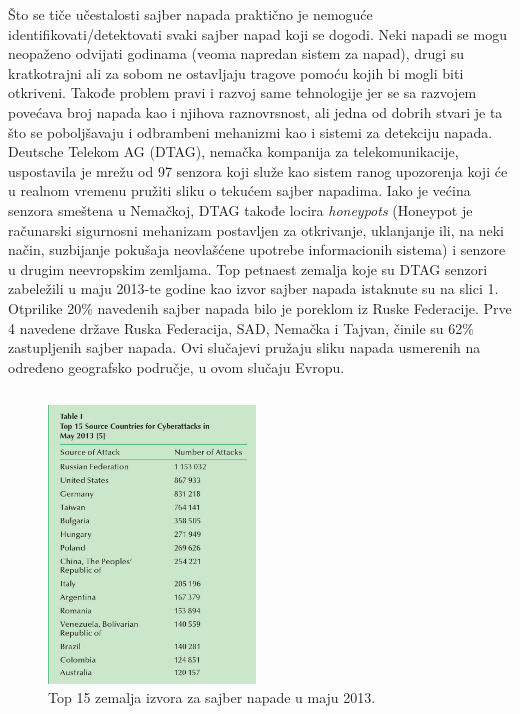 \documentclass[a4paper]{article}
\begin{document}
{Što se tiče učestalosti sajber napada praktično je nemoguće identifikovati/detektovati svaki sajber napad koji se dogodi.
Neki napadi se mogu neopaženo odvijati godinama (veoma napredan sistem za napad), drugi su kratkotrajni ali za sobom ne ostavljaju tragove pomoću kojih bi mogli biti otkriveni.
Takođe problem pravi i razvoj same tehnologije jer se sa razvojem povećava broj napada kao i njihova raznovrsnost, ali jedna od dobrih stvari je ta što se poboljšavaju i odbrambeni mehanizmi kao i sistemi za detekciju napada.  
Deutsche Telekom AG (DTAG), nemačka kompanija za telekomunikacije, uspostavila je mrežu od 97 senzora koji
služe kao sistem ranog upozorenja koji će u realnom vremenu pružiti  sliku o tekućem sajber napadima.
Iako je većina senzora smeštena u Nemačkoj, DTAG takođe locira \emph{honeypots} (Honeypot je računarski sigurnosni mehanizam postavljen za otkrivanje, uklanjanje ili, na neki način, suzbijanje pokušaja neovlašćene upotrebe informacionih sistema)
i senzore u drugim neevropskim zemljama.
\newline
Top petnaest zemalja koje su DTAG senzori zabeležili u maju 2013-te godine kao izvor sajber napada istaknute su na slici 1.
Otprilike 20\% navedenih sajber napada bilo je poreklom iz Ruske Federacije.
Prve 4 navedene države Ruska Federacija, SAD, Nemačka i Tajvan, činile su 62\% zastupljenih sajber napada.
Ovi slučajevi pružaju sliku napada usmerenih na određeno geografsko područje, u ovom slučaju Evropu.

 


\begin{verbatim}
\end{verbatim}

\begin{figure}[h!]
  \centering
  \begin{center}
  \includegraphics[width=55mm]{slika1.jpg}
  \end{center}
  \caption{Top 15 zemalja izvora za sajber napade u maju 2013. \cite{Overview of current cyber attacks}}
  \label{fig:vr1}
\end{figure}

}
\end{document}
